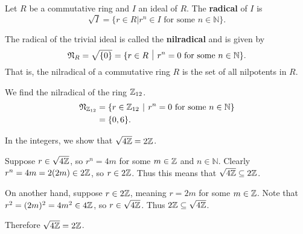 \begin{definition}
    Let $R$ be a commutative ring and $I$ an ideal of $R$. The \textbf{radical} of $I$ is
    \[
        \sqrt I = \{r \in R \vert r^n \in I \text{ for some } n \in \mathbb{N}\}.
    \]
\end{definition}
\begin{definition}
    The radical of the trivial ideal is called the \textbf{nilradical} and is given by
    \[
        \Nilr{R} = \sqrt{\{0\}} = \{r \in R \vert r^n = 0 \text{ for some } n \in \mathbb{N}\}.
    \]
    That is, the nilradical of a commutative ring $R$ is the set of all nilpotents in $R$.
\end{definition}
\begin{example}
    We find the nilradical of the ring $\mathbb{Z}_{12}$.
    \begin{align*}
        \Nilr{\Z_{12}} &= \{r \in \Z_{12} \vert r^n = 0 \text{ for some } n \in \mathbb{N}\}\\
        &= \{0, 6\}.
    \end{align*}
\end{example}
\begin{example}
    In the integers, we show that $\sqrt{4\mathbb{Z}} = 2\mathbb{Z}$.

    Suppose $r \in \sqrt{4\mathbb{Z}}$, so $r^n = 4m$ for some $m \in \mathbb{Z}$ and $n \in \mathbb{N}$. Clearly $r^n = 4m = 2(2m) \in 2\mathbb{Z}$, so $r \in 2\mathbb{Z}$. Thus this means that $\sqrt{4\mathbb{Z}} \subseteq 2\mathbb{Z}$.

    On another hand, suppose $r \in 2\mathbb{Z}$, meaning $r = 2m$ for some $m \in \mathbb{Z}$. Note that $r^2 = (2m)^2 = 4m^2 \in 4\mathbb{Z}$, so $r \in \sqrt{4\mathbb{Z}}$. Thus $2\mathbb{Z} \subseteq \sqrt{4\mathbb{Z}}$.

    Therefore $\sqrt{4\mathbb{Z}} = 2\mathbb{Z}$.
\end{example}

